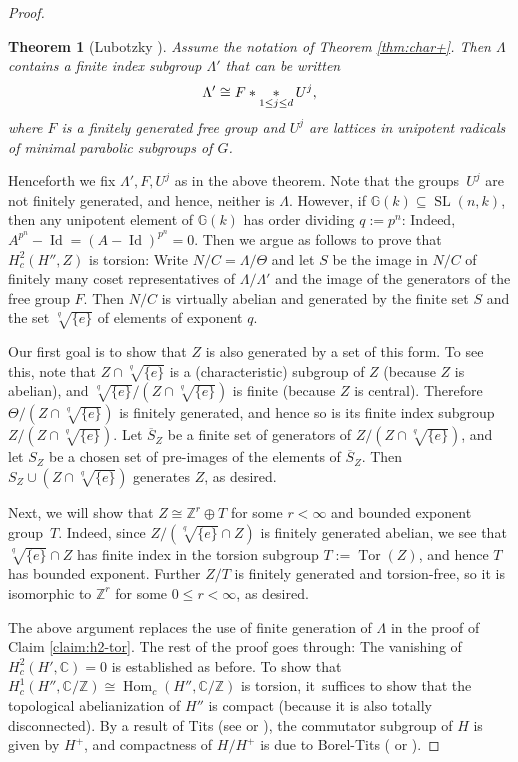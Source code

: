 \documentclass[11pt]{article}
\numberwithin{equation}{section}\providecommand{\llangle}{\langle\!\langle}\providecommand{\rrangle}{\rangle\!\rangle}\providecommand{\Asterisk}{\ast}
\newcommand{\bbC}{\ensuremath{\mathbb{C}}}
\newcommand{\bbG}{\ensuremath{\mathbb{G}}}
\newcommand{\bbZ}{\ensuremath{\mathbb{Z}}}
\DeclareMathOperator{\Id}{Id}
\DeclareMathOperator{\Hom}{Hom}
\DeclareMathOperator{\SL}{SL}
\DeclareMathOperator{\Tor}{Tor}
\newtheorem{thm}{Theorem}[section]
\theoremstyle{definition}
\begin{document}
\begin{proof}
\begin{thm}[{Lubotzky \cite[Th.\,2]{lubotzky-char+}}]\label{thm:lubotzky-char+}
Assume the notation of Theorem \ref{thm:char+}. Then $\Lambda$ contains a finite index subgroup $\Lambda'$ that can be written
\[
\Lambda' \cong F \ast \mathop{\Asterisk}_{1\leq j\leq d} U^j,
\]
where $F$ is a finitely generated free group and $U^j$ are lattices in unipotent radicals of minimal parabolic subgroups of $G$.
\end{thm}

Henceforth we fix $\Lambda', F, U^j$ as in the above theorem. Note that the groups~$U^j$ are not finitely generated, and hence, neither is $\Lambda$. However, if $\bbG(k)\subseteq \SL(n,k)$, then any unipotent element of $\bbG(k)$ has order dividing $q\!:=\!p^n$: Indeed, \hbox{$A^{p^n}\!\!-\Id \!=\! (A-\Id)^{p^n}\!=\!0$}. Then we argue as follows to prove that $H^2_c(H'',Z)$ is torsion: Write $N/C=\Lambda/\Theta$ and let $S$ be the image in $N/C$ of finitely many coset representatives of $\Lambda/\Lambda'$ and the image of the generators of the free group $F$. Then $N/C$ is virtually abelian and generated by the finite set $S$ and the set $\sqrt[q]{\{e\}}$ of elements of exponent $q$.

Our first goal is to show that $Z$ is also generated by a set of this form. To see this, note that $Z\cap \sqrt[q]{\{e\}}$ is a (characteristic) subgroup of $Z$ (because $Z$ is abelian), and $\sqrt[q]{\{e\}}/(Z\cap \sqrt[q]{\{e\}})$ is finite (because $Z$ is central). Therefore $\Theta/(Z\cap \sqrt[q]{\{e\}})$ is finitely generated, and hence so is its finite index subgroup $Z/(Z\cap \sqrt[q]{\{e\}})$. Let $\overline{S}_Z$ be a finite set of generators of $Z/(Z\cap \sqrt[q]{\{e\}})$, and let $S_Z$ be a chosen set of pre-images of the elements of $\overline{S}_Z$. Then $S_Z\cup (Z\cap \sqrt[q]{\{e\}})$ generates $Z$, as desired.

Next, we will show that $Z\cong \bbZ^r\oplus T$ for some $r<\infty$ and bounded exponent group~$T$. Indeed, since $Z/(\sqrt[q]{\{e\}}\cap Z)$ is finitely generated abelian, we see that $\sqrt[q]{\{e\}}\cap Z$ has finite index in the torsion subgroup $T:=\Tor(Z)$, and hence $T$ has bounded exponent. Further $Z/T$ is finitely generated and torsion-free, so it is isomorphic to $\bbZ^r$ for some $0\leq r<\infty$, as desired.

The above argument replaces the use of finite generation of $\Lambda$ in the proof of Claim \ref{claim:h2-tor}. The rest of the proof goes through: The vanishing of $H^2_c(H',\bbC)=0$ is established as before. To show that $H^1_c(H'',\bbC/\bbZ)\cong \Hom_c(H'',\bbC/\bbZ)$ is torsion, it~suffices to show that the topological abelianization of $H''$ is compact (because it is also totally disconnected). By a result of Tits (see \cite{tits-simple} or \cite[Th.\,I.1.5.6(ii)]{margulis-book}), the commutator subgroup of $H$ is given by $H^+$, and compactness of $H/H^+$ is due to Borel-Tits (\cite[6.14]{borel-tits-morphismes-abstraits} or \cite[I.2.3.1(b)]{margulis-book}).


\end{proof}
\end{document}
